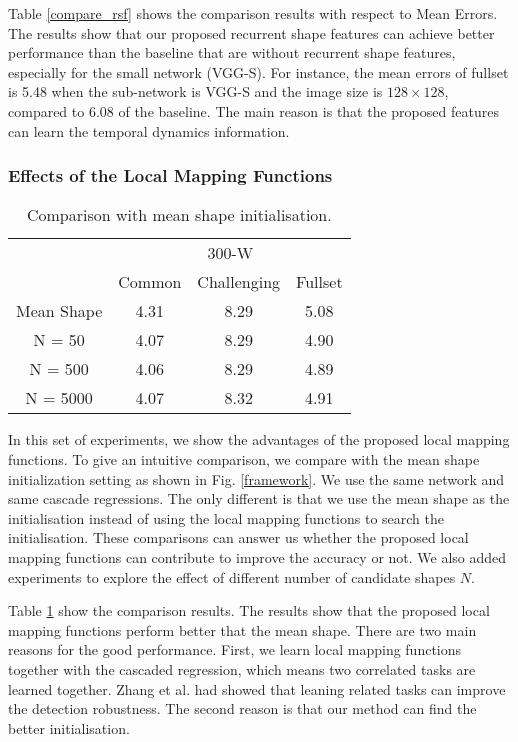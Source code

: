 \documentclass[journal]{IEEEtran}
\begin{document}
Table \ref{compare_rsf} shows the comparison results with respect to Mean Errors. The results show that our proposed recurrent shape features can achieve better performance than the baseline that are without recurrent shape features, especially for the small network (VGG-S). For instance, the mean errors of fullset is 5.48 when the sub-network is VGG-S and the image size is $128 \times 128$, compared to 6.08 of the baseline. The main reason is that the proposed features can learn the temporal dynamics information.

\subsubsection{Effects of the Local Mapping Functions} \label{Eff_LMF}

\begin{table}[h]
\small
    \centering \caption{Comparison with mean shape initialisation.}
    \begin{tabular}{c|c c c}
      \hline
 & \multicolumn{3}{|c}{300-W}\\
    & Common & Challenging & Fullset \\
        \hline
         Mean Shape  & 4.31 & 8.29 & 5.08  \\
         \hline
        N = 50 & 4.07 & 8.29 & 4.90 \\
        \hline
        N = 500 & 4.06  & 8.29 & 4.89 \\
        \hline
        N = 5000 & 4.07 & 8.32 & 4.91 \\
        \hline
        \end{tabular}
    \label{mean_shape}
\end{table}

In this set of experiments, we show the advantages of the proposed local mapping functions. To give an intuitive comparison, we compare with the mean shape initialization setting as shown in Fig. \ref{framework}. We use the same network and same cascade regressions. The only different is that we use the mean shape as the initialisation instead of using the local mapping functions to search the initialisation. These comparisons can answer us whether the proposed local mapping functions can contribute to improve the accuracy or not. We also added experiments to explore the effect of different number of candidate shapes $N$.

Table \ref{mean_shape} show the comparison results. The results show that the proposed local mapping functions perform better that the mean shape. There are two main reasons for the good performance. First, we learn local mapping functions together with the cascaded regression, which means two correlated tasks are learned together. Zhang et al. \cite{zhang2014facial} had showed that leaning related tasks can improve the detection robustness. The second reason is that our method can find the better initialisation. %
\end{document}
